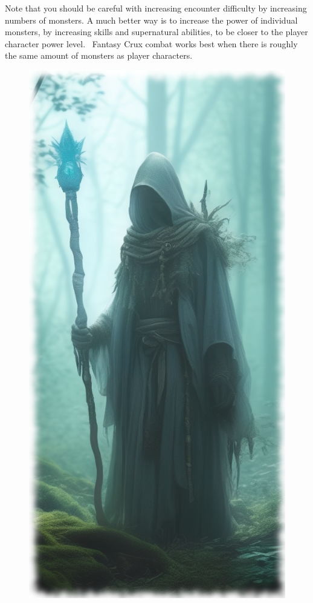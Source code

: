 \vspace{1em}

Note that you should be careful with increasing encounter difficulty by increasing numbers of monsters. A much better way is to increase the power of individual monsters, by increasing skills and supernatural abilities, to be closer to the player character power level.  Fantasy Crux combat works best when there is roughly the same amount of monsters as player characters.

\begin{figure}
\begin{center}
\includegraphics[scale=0.49]{img/ai-images/ghostly-wizard.png}
\end{center}
\end{figure}


